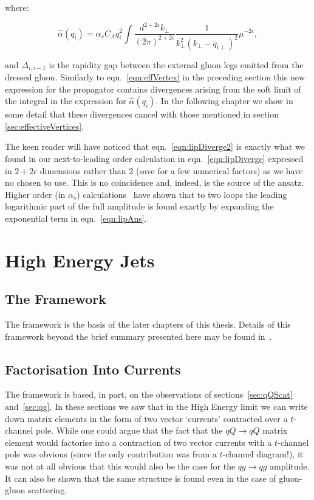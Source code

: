 	where:

	\begin{equation}
		\hat{\alpha}(q_i) = \alpha_sC_Aq_i^2\int \frac{d^{2+2\epsilon}k_{\perp}}{(2\pi)^{2+2\epsilon}}
		\frac{1}{k^2_\perp(k_\perp - q_{i\perp})^2}\mu^{-2\epsilon},
		\label{eqn:lipDiverge2}
	\end{equation}

	and $\Delta_{i,i-1}$ is the rapidity gap between the external gluon legs emitted from
	the dressed gluon.  Similarly to eqn.~\eqref{eqn:effVertex} in the preceding section this
	new expression for the propagator contains divergences arising from the soft limit
	of the integral in the expression for $\hat{\alpha}(q_i)$.  In the following chapter we
	show in some detail that these divergences cancel with those mentioned in section
	\ref{sec:effectiveVertices}.

	The keen reader will have noticed that eqn.~\eqref{eqn:lipDiverge2} is exactly what we
	found in our next-to-leading order calculation in eqn.~\eqref{eqn:lipDiverge} expressed
	in $2+2\epsilon$ dimensions rather than 2 (save for a few numerical factors) as we have
	no chosen to use.  This is no coincidence and, indeed, is the source of the ansatz.  Higher
	order (in $\alpha_s$) calculations~\cite{DelDuca:1995hf,9780511524387} have shown that to
	two loops the leading logarithmic part of the full amplitude is found exactly by expanding
	the exponential term in eqn.~\eqref{eqn:lipAns}.

\section{High Energy Jets}
	\label{sec:HEJ}

	\subsection{The \hej Framework}

	The \hej framework is the basis of the later chapters of this thesis.  Details of this framework
	beyond the brief summary presented here may be found in~\cite{ZPaper,Andersen:2009nu,Andersen:2009he,
	Andersen:2011hs,Andersen:2012gk}.

	\subsection{Factorisation Into Currents}
	\label{sec:currents}

		The \hej framework is based, in part, on the observations of sections~\eqref{sec:qQScat}
		and~\eqref{sec:qg}.  In these sections we saw that in the High Energy limit we can write down
		matrix elements in the form of two vector `currents' contracted over a $t$-channel pole.  While
		one could argue that the fact that the $qQ\to qQ$ matrix element would factorise into a contraction
		of two vector currents with a $t$-channel pole was obvious (since the only contribution was
		from a $t$-channel diagram!), it was not at all obvious that this would also be the case for the
		$qg\to qg$ amplitude.  It can also be shown that the same structure is found even in the case of
		gluon-gluon scattering\cite{Andersen:2011hs}.

